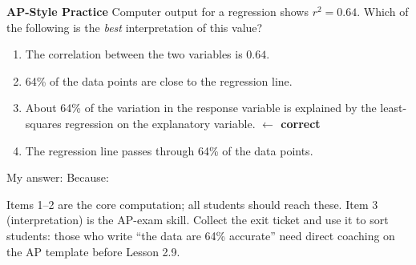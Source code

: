 \documentclass[10pt]{article}
\begin{document}
\begin{tcolorbox}[colback=redbg, colframe=redacc, boxrule=0.8pt, arc=2mm,
    left=4mm, right=4mm, top=2.5mm, bottom=2.5mm]
\small\textbf{AP-Style Practice}\enspace
Computer output for a regression shows $r^2 = 0.64$. Which of the following is the
\emph{best} interpretation of this value?

\vspace{7pt}
\begin{enumerate}[label=\textbf{(\Alph*)}, leftmargin=2em, itemsep=4pt]
  \item The correlation between the two variables is $0.64$.
  \item 64\% of the data points are close to the regression line.
  \item About 64\% of the variation in the response variable is explained by the least-squares regression on the explanatory variable.
        \textcolor{keyred}{\textbf{$\leftarrow$ correct}}
  \item The regression line passes through 64\% of the data points.
\end{enumerate}
\end{tcolorbox}

\vspace{0.08in}
\noindent\textcolor{slate}{\small My answer:  \quad Because: }

\begin{teachernote}
Items 1--2 are the core computation; all students should reach these. Item 3 (interpretation)
is the AP-exam skill. Collect the exit ticket and use it to sort students: those who write
``the data are 64\% accurate'' need direct coaching on the AP template before Lesson 2.9.
\end{teachernote}
\end{document}
